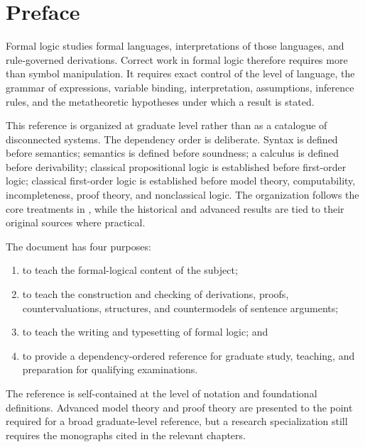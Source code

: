 \chapter*{Preface}

Formal logic studies formal languages, interpretations of those languages,
and rule-governed derivations.  Correct work in formal logic therefore requires
more than symbol manipulation.  It requires exact control of the level of
language, the grammar of expressions, variable binding, interpretation,
assumptions, inference rules, and the metatheoretic hypotheses under which a
result is stated.

This reference is organized at graduate level rather than as a catalogue of
disconnected systems.  The dependency order is deliberate.  Syntax is
defined before semantics; semantics is defined before soundness; a calculus is
defined before derivability; classical propositional logic is established
before first-order logic; classical first-order logic is established before
model theory, computability, incompleteness, proof theory, and nonclassical
logic.  The organization follows the core treatments in
\cite{Enderton2001,EbbinghausFlumThomas1994,OpenLogic2026,Marker2024}, while the
historical and advanced results are tied to their original sources where
practical.

The document has four purposes:
\begin{enumerate}
  \item to teach the formal-logical content of the subject;
  \item to teach the construction and checking of derivations, proofs,
        countervaluations, structures, and countermodels of sentence
        arguments;
  \item to teach the writing and typesetting of formal logic; and
  \item to provide a dependency-ordered reference for graduate study, teaching,
        and preparation for qualifying examinations.
\end{enumerate}

The reference is self-contained at the level of notation and foundational
definitions.  Advanced model theory and proof theory are presented to the
point required for a broad graduate-level reference, but a research specialization
still requires the monographs cited in the relevant chapters.

